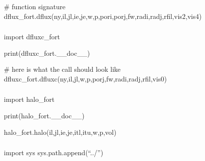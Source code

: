 \documentclass[letterpaper,10pt,english]{sphinxmanual}
\begin{document}
\sphinxAtStartPar
\# function signature
dflux\_fort.dflux(ny,il,jl,ie,je,w,p,pori,porj,fw,radi,radj,rfil,vis2,vis4)


\subsubsection{}
\label{\detokenize{autoapi/tests/test_dfluxc/index:module-tests.test_dfluxc}}\label{\detokenize{autoapi/tests/test_dfluxc/index:tests-test-dfluxc}}\label{\detokenize{autoapi/tests/test_dfluxc/index::doc}}
\sphinxAtStartPar
import dfluxc\_fort

\sphinxAtStartPar
print(dfluxc\_fort.\_\_doc\_\_)

\sphinxAtStartPar
\# here is what the call should look like
dfluxc\_fort.dfluxc(ny,il,jl,w,p,porj,fw,radi,radj,rfil,vis0)


\subsubsection{}
\label{\detokenize{autoapi/tests/test_eflux/index:module-tests.test_eflux}}\label{\detokenize{autoapi/tests/test_eflux/index:tests-test-eflux}}\label{\detokenize{autoapi/tests/test_eflux/index::doc}}

\subsubsection{}
\label{\detokenize{autoapi/tests/test_halo/index:module-tests.test_halo}}\label{\detokenize{autoapi/tests/test_halo/index:tests-test-halo}}\label{\detokenize{autoapi/tests/test_halo/index::doc}}
\sphinxAtStartPar
import halo\_fort

\sphinxAtStartPar
print(halo\_fort.\_\_doc\_\_)

\sphinxAtStartPar
halo\_fort.halo(il,jl,ie,je,itl,itu,w,p,vol)


\subsubsection{}
\label{\detokenize{autoapi/tests/test_nsflux/index:module-tests.test_nsflux}}\label{\detokenize{autoapi/tests/test_nsflux/index:tests-test-nsflux}}\label{\detokenize{autoapi/tests/test_nsflux/index::doc}}
\sphinxAtStartPar
import sys
sys.path.append(“../”)
\end{document}
